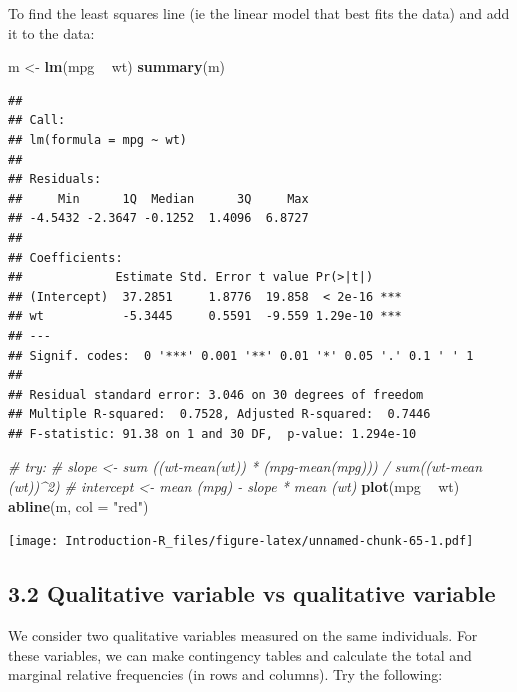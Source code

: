\documentclass[]{book}
\newenvironment{Shaded}{\begin{snugshade}}{\end{snugshade}}
\newcommand{\CommentTok}[1]{\textcolor[rgb]{0.56,0.35,0.01}{\textit{#1}}}
\newcommand{\DataTypeTok}[1]{\textcolor[rgb]{0.13,0.29,0.53}{#1}}
\newcommand{\KeywordTok}[1]{\textcolor[rgb]{0.13,0.29,0.53}{\textbf{#1}}}
\newcommand{\NormalTok}[1]{#1}
\newcommand{\OperatorTok}[1]{\textcolor[rgb]{0.81,0.36,0.00}{\textbf{#1}}}
\newcommand{\StringTok}[1]{\textcolor[rgb]{0.31,0.60,0.02}{#1}}
\begin{document}
To find the least squares line (ie the linear model that best fits the data) and add it to the data:

\begin{Shaded}
\begin{Highlighting}[]
\NormalTok{m <-}\StringTok{ }\KeywordTok{lm}\NormalTok{(mpg }\OperatorTok{~}\StringTok{ }\NormalTok{wt)}
\KeywordTok{summary}\NormalTok{(m)}
\end{Highlighting}
\end{Shaded}

\begin{verbatim}
## 
## Call:
## lm(formula = mpg ~ wt)
## 
## Residuals:
##     Min      1Q  Median      3Q     Max 
## -4.5432 -2.3647 -0.1252  1.4096  6.8727 
## 
## Coefficients:
##             Estimate Std. Error t value Pr(>|t|)    
## (Intercept)  37.2851     1.8776  19.858  < 2e-16 ***
## wt           -5.3445     0.5591  -9.559 1.29e-10 ***
## ---
## Signif. codes:  0 '***' 0.001 '**' 0.01 '*' 0.05 '.' 0.1 ' ' 1
## 
## Residual standard error: 3.046 on 30 degrees of freedom
## Multiple R-squared:  0.7528,	Adjusted R-squared:  0.7446 
## F-statistic: 91.38 on 1 and 30 DF,  p-value: 1.294e-10
\end{verbatim}

\begin{Shaded}
\begin{Highlighting}[]
\CommentTok{# try:}
\CommentTok{# slope <- sum ((wt-mean(wt)) * (mpg-mean(mpg))) / sum((wt-mean (wt))^2)}
\CommentTok{# intercept <- mean (mpg) - slope * mean (wt)}
\KeywordTok{plot}\NormalTok{(mpg }\OperatorTok{~}\StringTok{ }\NormalTok{wt)}
\KeywordTok{abline}\NormalTok{(m, }\DataTypeTok{col =} \StringTok{"red"}\NormalTok{)}
\end{Highlighting}
\end{Shaded}

\texttt{[image: Introduction-R\_files/figure-latex/unnamed-chunk-65-1.pdf]}

\hypertarget{qualitative-variable-vs-qualitative-variable}{%
\subsection{3.2 Qualitative variable vs qualitative variable}\label{qualitative-variable-vs-qualitative-variable}}

We consider two qualitative variables measured on the same individuals. For these variables, we can make contingency tables and calculate the total and marginal relative frequencies (in rows and columns). Try the following:
\end{document}
